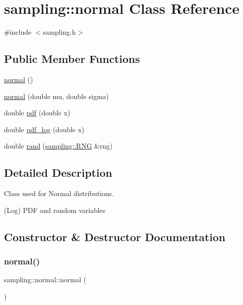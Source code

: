 \hypertarget{classsampling_1_1normal}{}\section{sampling\+:\+:normal Class Reference}
\label{classsampling_1_1normal}


{\ttfamily \#include $<$sampling.\+h$>$}

\subsection*{Public Member Functions}
\begin{DoxyCompactItemize}
\item 
\hyperlink{classsampling_1_1normal_a9dfb3d0da3d1517226d102ed3acd33c1}{normal} ()
\item 
\hyperlink{classsampling_1_1normal_a94983a66f0b0b3ef8414e8811660c797}{normal} (double mu, double sigma)
\item 
double \hyperlink{classsampling_1_1normal_ad9da5ab3d50569e418f00ace7ac26fa7}{pdf} (double x)
\item 
double \hyperlink{classsampling_1_1normal_a9a74b03f4276eb622d3c259fd8a1ea01}{pdf\+\_\+log} (double x)
\item 
double \hyperlink{classsampling_1_1normal_a12d6d445fc209f91733aa6f8140001be}{rand} (\hyperlink{classsampling_1_1RNG}{sampling\+::\+R\+NG} \&rng)
\end{DoxyCompactItemize}


\subsection{Detailed Description}
Class used for Normal distributions.

(Log) P\+DF and random variables 

\subsection{Constructor \& Destructor Documentation}
\mbox{\label{classsampling_1_1normal_a9dfb3d0da3d1517226d102ed3acd33c1}} 
\subsubsection{\texorpdfstring{normal()}{normal()}\hspace{0.1cm}{\footnotesize\ttfamily [1/2]}}
{\footnotesize\ttfamily sampling\+::normal\+::normal (\begin{DoxyParamCaption}{ }\end{DoxyParamCaption})}

